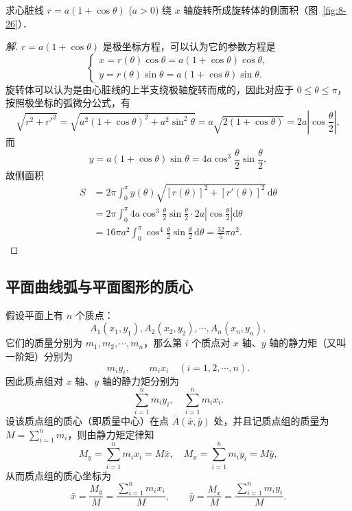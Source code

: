 \begin{example}
求心脏线 $r = a(1 + \cos\theta)$ ($a > 0$) 绕 $x$ 轴旋转所成旋转体的侧面积（图~\ref{fig:8-26}）．
\end{example}

\begin{proof}[解]
$r = a(1 + \cos\theta)$ 是极坐标方程，可以认为它的参数方程是
\[
\begin{cases}
x = r(\theta)\cos\theta = a(1 + \cos\theta)\cos\theta, \\
y = r(\theta)\sin\theta = a(1 + \cos\theta)\sin\theta.
\end{cases}
\]
旋转体可以认为是由心脏线的上半支绕极轴旋转而成的，因此对应于 $0 \leqslant \theta \leqslant \pi$，按照极坐标的弧微分公式，有
\[
\sqrt{r^2 + r'^2} = \sqrt{a^2(1 + \cos\theta)^2 + a^2\sin^2\theta} = a\sqrt{2(1 + \cos\theta)} = 2a\left|\cos\frac{\theta}{2}\right|,
\]
而
\[
y = a(1 + \cos\theta)\sin\theta = 4a\cos^3\frac{\theta}{2}\sin\frac{\theta}{2},
\]
故侧面积
\begin{align*}
S &= 2\pi\int_0^\pi y(\theta)\sqrt{[r(\theta)]^2 + [r'(\theta)]^2}\,\mathrm{d}\theta \\
&= 2\pi\int_0^\pi 4a\cos^3\frac{\theta}{2}\sin\frac{\theta}{2}\cdot 2a\left|\cos\frac{\theta}{2}\right|\mathrm{d}\theta \\
&= 16\pi a^2\int_0^\pi \cos^4\frac{\theta}{2}\sin\frac{\theta}{2}\,\mathrm{d}\theta = \frac{32}{5}\pi a^2.
\end{align*}
\end{proof}


\subsection{平面曲线弧与平面图形的质心}\label{subsec:8-2-7}

假设平面上有 $n$ 个质点：
\[
A_1(x_1, y_1), A_2(x_2, y_2), \cdots, A_n(x_n, y_n),
\]
它们的质量分别为 $m_1, m_2, \cdots, m_n$，那么第 $i$ 个质点对 $x$ 轴、$y$ 轴的静力矩（又叫一阶矩）分别为
\[
m_i y_i, \qquad m_i x_i \quad (i = 1, 2, \cdots, n).
\]
因此质点组对 $x$ 轴、$y$ 轴的静力矩分别为
\[
\sum_{i=1}^n m_i y_i, \quad \sum_{i=1}^n m_i x_i.
\]
设该质点组的质心（即质量中心）在点 $\bar{A}(\bar{x}, \bar{y})$ 处，并且记质点组的质量为 $M = \sum_{i=1}^n m_i$，则由静力矩定律知
\[
M_y = \sum_{i=1}^n m_i x_i = M\bar{x}, \quad M_x = \sum_{i=1}^n m_i y_i = M\bar{y},
\]
从而质点组的质心坐标为
\[
\bar{x} = \frac{M_y}{M} = \frac{\sum_{i=1}^n m_i x_i}{M}, \qquad \bar{y} = \frac{M_x}{M} = \frac{\sum_{i=1}^n m_i y_i}{M}.
\]


